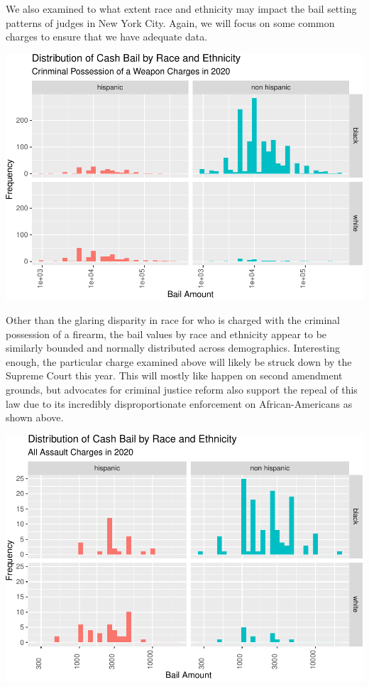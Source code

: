 \documentclass[
  english,
  man]{apa6}
\begin{document}
We also examined to what extent race and ethnicity may impact the bail setting patterns of judges in New York City. Again, we will focus on some common charges to ensure that we have adequate data.

\includegraphics{bail_reform_shamp_thesis_files/figure-latex/cpw_race_distrb-1.pdf}

Other than the glaring disparity in race for who is charged with the criminal possession of a firearm, the bail values by race and ethnicity appear to be similarly bounded and normally distributed across demographics. Interesting enough, the particular charge examined above will likely be struck down by the Supreme Court this year. This will mostly like happen on second amendment grounds, but advocates for criminal justice reform also support the repeal of this law due to its incredibly disproportionate enforcement on African-Americans as shown above.

\includegraphics{bail_reform_shamp_thesis_files/figure-latex/120_race_distrb-1.pdf}
\end{document}

